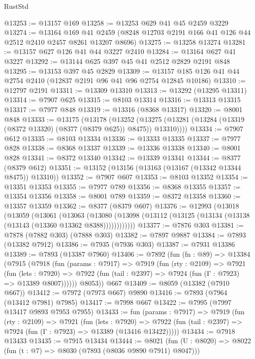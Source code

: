 \begin{lexlean}{RustStd}
\begin{coremodule}
{\begin{coremodule}
{{{{{{{{{{{{{{{{{{{{{{{{{{{{{{{{{{{{{{{{{{{{{{{{{{@13253 := @13157 @169
@13258 := @13253 @629 @41 @45 @2459 @3229
@13274 := @13164
    @169
    @41
    @2459
    (@8248 @12703 @2191 @166 @41 @126 @44 @2512 @2410 @2457 @8261 @13207 @8696)
@13275 := @13258 @13274
@13281 := @13157 @627 @126 @41 @44 @3227 @2410
@13284 := @13164 @627 @41 @3227
@13292 := @13144 @625 @397 @45 @41 @2512 @2829 @2191 @848
@13295 := @13153 @397 @45 @2829
@13309 := @13157 @185 @126 @41 @44 @2754 @2410 (@12837 @2191 @96 @41 @96 @2754 @12845 @10186)
@13310 := @12797 @2191
@13311 := @13309 @13310
@13313 := @13292 (@13295 @13311)
@13314 := @7907 @625
@13315 := @8103 @13314
@13316 := @13313 @13315
@13317 := @7977 @848
@13319 := @13316 (@8368 @13317)
@13320 := @8001 @848
@13333 := @13175
    (@13178
      (@13252 (@13275 (@13281 (@13284 (@13319 (@8372 @13320) (@8377 (@8379 @625)) @8475)) @13310))))
@13334 := @7907 @612
@13335 := @8103 @13334
@13336 := @13333 @13335
@13337 := @7977 @828
@13338 := @8368 @13337
@13339 := @13336 @13338
@13340 := @8001 @828
@13341 := @8372 @13340
@13342 := @13339 @13341
@13344 := @8377 (@8379 @612)
@13351 := @13152 (@13156 (@13163 (@13167 (@13342 @13344 @8475)) @13310))
@13352 := @7907 @607
@13353 := @8103 @13352
@13354 := @13351 @13353
@13355 := @7977 @789
@13356 := @8368 @13355
@13357 := @13354 @13356
@13358 := @8001 @789
@13359 := @8372 @13358
@13360 := @13357 @13359
@13362 := @8377 (@8379 @607)
@13376 := @12993
    (@13018
      (@13059
        (@13061
          (@13063
            (@13080 (@13098 (@13112 (@13125 (@13134 (@13138 (@13143 (@13360 @13362 @8388))))))))))))
@13377 := @7876 @303
@13381 := @7878 (@7882 @303) (@7888 @303)
@13382 := @7897 @9887
@13384 := @7893 (@13382 @7912)
@13386 := @7935 (@7936 @303)
@13387 := @7931 @13386
@13389 := @7893 (@13387 @7960)
@13406 := @7892
    (fun (fn : @89) =>
    @13384
      (@7915
        (@7918
          (fun (params : @7917) =>
          @7919
            (fun (rty : @2109) =>
            @7921
              (fun (lets : @7920) =>
              @7922 (fun (tail : @2397) => @7924 (fun (Γ : @7923) => @13389 @8007))))))
        @8053))
    @667
@13409 := @8059 (@13382 (@7910 @667))
@13412 := @7972 (@7973 @667) @9890
@13416 := @7893 (@7964 (@13412 @7981) @7985)
@13417 := @7998 @667
@13422 := @7995 (@7997 @13417 @9893 @7953 @7955)
@13433 := fun (params : @7917) =>
  @7919
    (fun (rty : @2109) =>
    @7921
      (fun (lets : @7920) =>
      @7922 (fun (tail : @2397) => @7924 (fun (Γ : @7923) => @13389 (@13416 @13422)))))
@13434 := @7918 @13433
@13435 := @7915 @13434
@13444 := @8021 (fun (U : @8020) => @8022 (fun (t : @7) => @8030 (@7893 (@8036 @9890 @7911) @8047)))
}}}}}}}}}}}}}}}}}}}}}}}}}}}}}}}}}}}}}}}}}}}}}}}}}}
\end{coremodule}}
\end{coremodule}
\end{lexlean}
